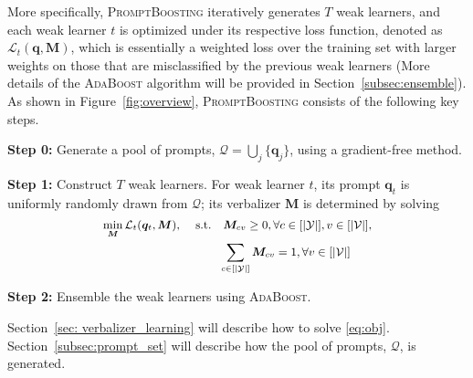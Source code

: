 \documentclass{article}
\theoremstyle{plain}
\theoremstyle{definition}
\theoremstyle{remark}
\newcommand{\alg}{\textsc{PromptBoosting}}
\begin{document}
More specifically, {\alg} iteratively generates $T$ weak learners, and each weak learner $t$ is optimized under its respective loss function, denoted as $\mathcal{L}_t(\bm q, \bm M)$, which is essentially a weighted loss over the training set with larger weights on those that are misclassified by the previous weak learners (More details of the \textsc{AdaBoost} algorithm will be provided in Section~\ref{subsec:ensemble}). As shown in Figure~\ref{fig:overview}, {\alg} consists of the following key steps.

\textbf{Step 0:} Generate a pool of prompts, $\mathcal{Q} = \bigcup_j \{\bm q_j\}$, using a gradient-free method.

\textbf{Step 1:} Construct $T$ weak learners. For weak learner $t$, its prompt $\bm q_t$ is uniformly randomly drawn from $\mathcal{Q}$; its verbalizer $\bm M$ is determined by solving 
\begin{equation}
\small
\begin{aligned}
     \min_{\bm M} \mathcal{L}_t(\bm q_t, \bm M), \ \ \ \
     & \mbox{s.t.} \quad \bm M_{cv} \geq 0, \forall c \in [|\mathcal{Y}|], v \in [|\mathcal{V}|],\\
     & \ \ \ \ \ \ \sum_{c \in [|\mathcal{Y}|]} \bm M_{cv} = 1, \forall v \in [|\mathcal{V}|]
\end{aligned}
\label{eq:obj}
\end{equation}

\textbf{Step 2:} Ensemble the weak learners using \textsc{AdaBoost}.

Section~\ref{sec: verbalizer_learning} will describe how to solve \eqref{eq:obj}. Section~\ref{subsec:prompt_set} will describe how the pool of prompts, $\mathcal{Q}$, is generated.
\end{document}
